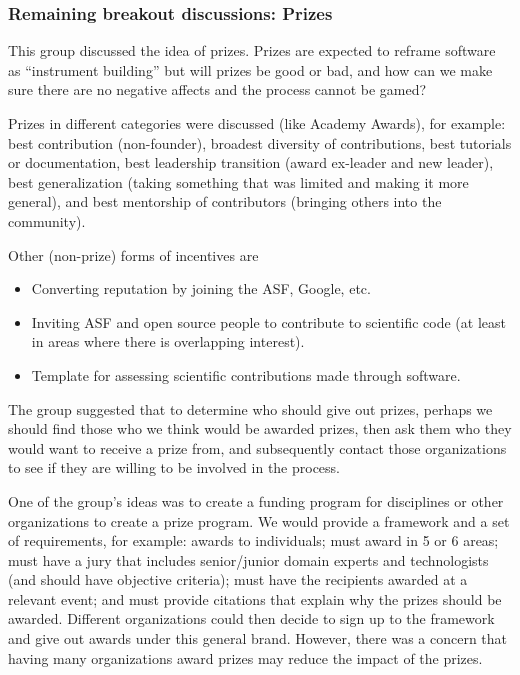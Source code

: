 \documentclass[11pt, oneside]{amsart}
\newcommand{\note}[1]{ {\textcolor{blueish}    { ***Note:      #1 }}}
\begin{document}
\subsubsection{Remaining breakout discussions: Prizes}\label{sec:prizes}

This group discussed the idea of prizes. Prizes are expected to reframe software
as ``instrument building'' but will prizes be good or bad, and how can we make
sure there are no negative affects and the process cannot be gamed?

Prizes in different categories were discussed (like Academy Awards), for
example: best contribution (non-founder), broadest diversity of contributions,
best tutorials or documentation, best leadership transition (award ex-leader and
new leader), best generalization (taking something that was limited and making
it more general), and best mentorship of contributors (bringing others into the
community).

Other (non-prize) forms of incentives are
\begin{itemize}
\item Converting reputation by joining the ASF, Google, etc.
\item Inviting ASF and open source people to contribute to scientific code (at
least in areas where there is overlapping interest).
\item Template for assessing scientific contributions made through software.
\end{itemize}

The group suggested that to determine who should give out prizes, perhaps we
should find those who we think would be awarded prizes, then ask them who they
would want to receive a prize from, and subsequently contact those organizations to see if they
are willing to be involved in the process.

One of the group's ideas was to create a funding program for disciplines or
other organizations to create a prize program. We would provide a framework and
a set of requirements, for example: awards to individuals; must award in 5 or 6
areas; must have a jury that includes senior/junior
domain experts and technologists (and should have objective criteria); must have the recipients awarded at a
relevant event; and must provide citations that explain why the prizes should be
awarded. Different organizations could then decide to sign up to the framework
and give out awards under this general brand. However, there was a concern that
having many organizations award prizes may reduce the impact of the prizes.
\end{document}
